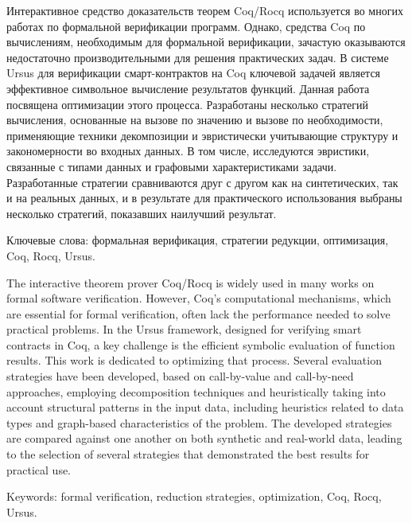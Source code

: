 \documentclass[../thesis.tex]{subfiles}
\begin{document}
Интерактивное средство доказательств теорем Coq/Rocq используется во многих работах по формальной верификации программ. Однако, средства Coq по вычислениям, необходимым для формальной верификации, зачастую оказываются недостаточно производительными для решения практических задач. В системе Ursus для верификации смарт-контрактов на Coq ключевой задачей является эффективное символьное вычисление результатов функций. Данная работа посвящена оптимизации этого процесса. Разработаны несколько стратегий вычисления, основанные на вызове по значению и вызове по необходимости, применяющие техники декомпозиции и эвристически учитывающие структуру и закономерности во входных данных. В том числе, исследуются эвристики, связанные с типами данных и графовыми характеристиками задачи. Разработанные стратегии сравниваются друг с другом как на синтетических, так и на реальных данных, и в результате для практического использования выбраны несколько стратегий, показавших наилучший результат.

\vspace*{\fill}

Ключевые слова: формальная верификация, стратегии редукции, оптимизация, Coq, Rocq, Ursus.

\newpage

The interactive theorem prover Coq/Rocq is widely used in many works on formal software verification. However, Coq's computational mechanisms, which are essential for formal verification, often lack the performance needed to solve practical problems. In the Ursus framework, designed for verifying smart contracts in Coq, a key challenge is the efficient symbolic evaluation of function results. This work is dedicated to optimizing that process. Several evaluation strategies have been developed, based on call-by-value and call-by-need approaches, employing decomposition techniques and heuristically taking into account structural patterns in the input data, including heuristics related to data types and graph-based characteristics of the problem. The developed strategies are compared against one another on both synthetic and real-world data, leading to the selection of several strategies that demonstrated the best results for practical use.

\vspace*{\fill}

Keywords: formal verification, reduction strategies, optimization, Coq, Rocq, Ursus.
\end{document}
